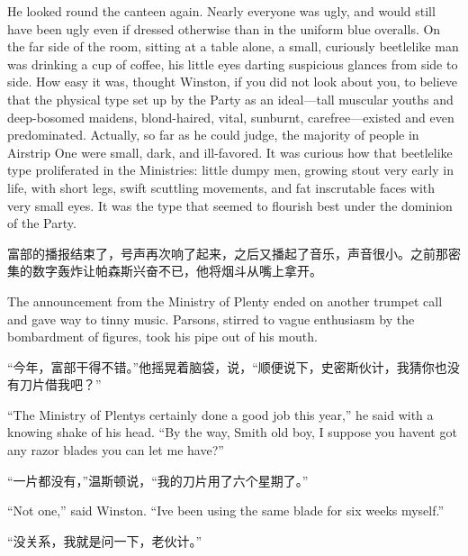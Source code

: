 \begin{paracol}{2}
\switchcolumn*

He looked round the canteen again. Nearly everyone was ugly, and would
still have been ugly even if dressed otherwise than in the uniform blue
overalls. On the far side of the room, sitting at a table alone, a
small, curiously beetlelike man was drinking a cup of coffee, his little
eyes darting suspicious glances from side to side. How easy it was,
thought Winston, if you did not look about you, to believe that the
physical type set up by the Party as an ideal---tall muscular youths and
deep-bosomed maidens, blond-haired, vital, sunburnt, carefree---existed
and even predominated. Actually, so far as he could judge, the majority
of people in Airstrip One were small, dark, and ill-favored. It was
curious how that beetlelike type proliferated in the Ministries: little
dumpy men, growing stout very early in life, with short legs, swift
scuttling movements, and fat inscrutable faces with very small eyes. It
was the type that seemed to flourish best under the dominion of the
Party.

\switchcolumn

富部的播报结束了，号声再次响了起来，之后又播起了音乐，声音很小。之前那密集的数字轰炸让帕森斯兴奋不已，他将烟斗从嘴上拿开。

\switchcolumn*

The announcement from the Ministry of Plenty ended on another trumpet
call and gave way to tinny music. Parsons, stirred to vague enthusiasm
by the bombardment of figures, took his pipe out of his mouth.

\switchcolumn

``今年，富部干得不错。''他摇晃着脑袋，说，``顺便说下，史密斯伙计，我猜你也没有刀片借我吧？''

\switchcolumn*

``The Ministry of Plenty\textquotesingle s certainly done a good job this
year,'' he said with a knowing shake of his head. ``By the way, Smith old
boy, I suppose you haven\textquotesingle t got any razor blades you can
let me have?''

\switchcolumn

``一片都没有，''温斯顿说，``我的刀片用了六个星期了。''

\switchcolumn*

``Not one,'' said Winston. ``I\textquotesingle ve been using the same blade
for six weeks myself.''

\switchcolumn

``没关系，我就是问一下，老伙计。''


\end{paracol}

